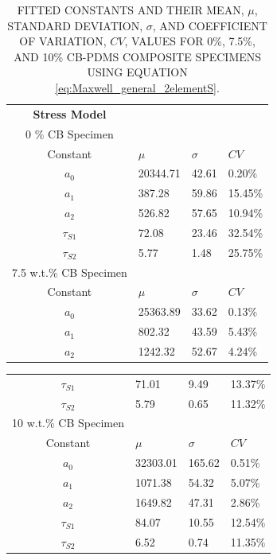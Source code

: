 \begin{table}[h!]
	\caption{FITTED CONSTANTS AND THEIR MEAN, $\mu$, STANDARD DEVIATION, $\sigma$, AND COEFFICIENT OF VARIATION, $CV$, VALUES FOR 0\%, 7.5\%, AND 10\% CB-PDMS COMPOSITE SPECIMENS USING EQUATION \ref{eq:Maxwell_general_2elementS}.}
	\begin{center}
		\label{tab:generalised_model_constants}
		\begin{tabular}{c l l l}
			\textbf{Stress Model} \\
			0 \% CB Specimen \\
			Constant & $\mu$ & $\sigma$ & $CV$ \\
			\hline
			$a_0$ & 20344.71 & 42.61 & 0.20\% \\
			$a_1$ & 387.28 & 59.86 & 15.45\% \\
			$a_2$ & 526.82 & 57.65 & 10.94\% \\
			$\tau_{S1}$ & 72.08 & 23.46 & 32.54\% \\
			$\tau_{S2}$ & 5.77 & 1.48 & 25.75\% \\
			\hline
			7.5 w.t.\% CB Specimen \\
			Constant & $\mu$ & $\sigma$ & $CV$ \\
			\hline
			$a_0$ & 25363.89 & 33.62 & 0.13\% \\
			$a_1$ & 802.32 & 43.59 & 5.43\% \\
			$a_2$ & 1242.32 & 52.67 & 4.24\% \\
		\end{tabular}
	\end{center}
\end{table}
\begin{table}[h!]
	\begin{center}
		\label{tab:generalised_model_constants}
		\begin{tabular}{c l l l}
			$\tau_{S1}$ & 71.01 & 9.49 & 13.37\% \\
			$\tau_{S2}$ & 5.79 & 0.65 & 11.32\% \\
			\hline
			10 w.t.\% CB Specimen \\
			Constant & $\mu$ & $\sigma$ & $CV$ \\
			\hline
			$a_0$ & 32303.01 & 165.62 & 0.51\% \\
			$a_1$ & 1071.38 & 54.32 & 5.07\% \\
			$a_2$ & 1649.82 & 47.31 & 2.86\% \\
			$\tau_{S1}$ & 84.07 & 10.55 & 12.54\% \\
			$\tau_{S2}$ & 6.52 & 0.74 & 11.35\% \\
			\hline
		\end{tabular}
	\end{center}
\end{table}
